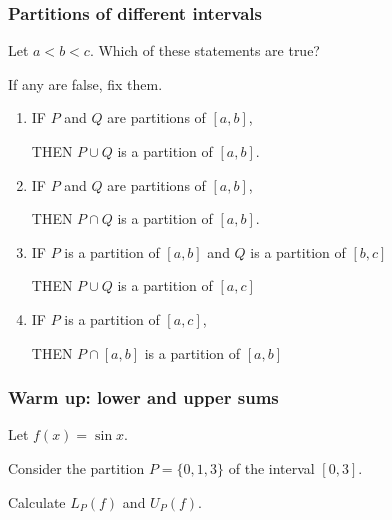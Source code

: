 \documentclass[14pt]{beamer}
\begin{document}
	\begin{frame}[t]
		\fontsize{13}{13}\selectfont
		\frametitle{Partitions of different intervals}

		Let $a<b<c$. Which of these statements are true?

		If any are false, fix them.
		\vspace{.1cm}
		\begin{enumerate}
			\item IF $P$ and $Q$ are partitions of $[a,b]$,
				\vspace{.1cm}

				THEN $P \cup Q$ is a partition of $[a,b]$.
				\vspace{.1cm}

			\item IF $P$ and $Q$ are partitions of $[a,b]$,
				\vspace{.1cm}

				THEN $P \cap Q$ is a partition of $[a,b]$.
				\vspace{.1cm}

			\item IF $P$ is a partition of $[a,b]$ and $Q$ is a partition of $[b,c]$
				\vspace{.1cm}

				THEN $P \cup Q$ is a partition of $[a,c]$
				\vspace{.1cm}

			\item IF $P$ is a partition of $[a,c]$,
				\vspace{.1cm}

				THEN $P \cap [a,b]$ is a partition of $[a,b]$
		\end{enumerate}
	\end{frame}

	\begin{frame}[t]
		\frametitle{Warm up: lower and upper sums}

		Let $\displaystyle f(x) = \sin x$.

		Consider the partition $\displaystyle P= \{0, 1, 3\}$ of the interval
		$\displaystyle [0,3]$.

		Calculate $\displaystyle L_{P}(f)$ and $\displaystyle U_{P}(f)$.
	\end{frame}

\end{document}
